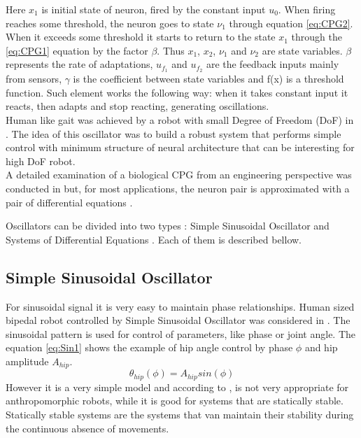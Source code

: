 \documentclass[12pt,a4paper]{report}
\begin{document}
		Here $x_1$  is initial state of neuron, fired by the constant input $u_0$. When firing reaches some threshold, the neuron goes to state $\nu_1$ through equation \ref{eq:CPG2}. When it exceeds some threshold it starts to return to the state $x_1$ through the \ref{eq:CPG1} equation by the factor $\beta$. Thus $x_1$, $x_2$, $\nu_1$ and $\nu_2$ are state variables. $\beta$ represents the rate of adaptations, $u_{f_1}$ and $u_{f_2}$ are the feedback inputs mainly from sensors, $\gamma$ is the coefficient between state variables and f(x) is a threshold function. Such element works the following way: when it takes constant input it reacts, then adapts and stop reacting, generating oscillations. \\ Human like gait was achieved by a robot with small Degree of Freedom (DoF) in \cite{miyakoshi1998three}. The idea of this oscillator was to build a robust system that performs simple control with minimum structure of neural architecture that can be interesting for high DoF robot.\\
		A detailed examination of a biological CPG from an engineering perspective was conducted in \cite{zhu2006central} but, for most applications, the neuron pair is approximated with a pair of differential equations \cite{wright2014intelligent}.

		Oscillators can be divided into two types : Simple Sinusoidal Oscillator and Systems of Differential Equations \cite{wright2014intelligent}. Each of them is described bellow.

		\subsection{Simple Sinusoidal Oscillator}
			For sinusoidal signal it is very easy to maintain phase relationships. Human sized bipedal robot controlled by Simple Sinusoidal Oscillator was considered in \cite{morimoto2008biologically}. The sinusoidal pattern is used for control of parameters, like phase or joint angle. The equation \ref{eq:Sin1} shows the example of hip angle control by phase $\phi$ and hip amplitude $A_{hip}$.
			\begin{equation}\label{eq:Sin1}
				\theta_{hip} (\phi) = A_{hip} sin(\phi) 
			\end{equation}
 			However it is a very simple model and according to \cite{wright2014intelligent}, is not very appropriate for anthropomorphic robots, while it is good for systems that are statically stable. Statically stable systems are the systems that van maintain their stability during the continuous absence of movements.
\end{document}

